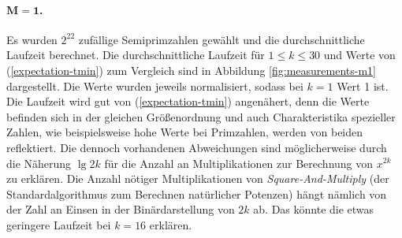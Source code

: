 \documentclass[a4paper, 10pt, ngerman]{article}
\begin{document}
    \paragraph{$\bm{M = 1}$.} Es wurden $2^{22}$ zufällige Semiprimzahlen gewählt und die durchschnittliche Laufzeit berechnet. Die durchschnittliche Laufzeit für $1 \le k \le 30$ und Werte von (\ref{expectation-tmin}) zum Vergleich sind in Abbildung \ref{fig:measurements-m1} dargestellt. Die Werte wurden jeweils normalisiert, sodass bei $k = 1$ Wert 1 ist. Die Laufzeit wird gut von (\ref{expectation-tmin}) angenähert, denn die Werte befinden sich in der gleichen Größenordnung und auch Charakteristika spezieller Zahlen, wie beispielsweise hohe Werte bei Primzahlen, werden von beiden reflektiert. Die dennoch vorhandenen Abweichungen sind möglicherweise durch die Näherung $\lg 2k$ für die Anzahl an Multiplikationen zur Berechnung von $x^{2k}$ zu erklären. Die Anzahl nötiger Multiplikationen von \emph{Square-And-Multiply} (der Standardalgorithmus zum Berechnen natürlicher Potenzen) hängt nämlich von der Zahl an Einsen in der Binärdarstellung von $2k$ ab. Das könnte die etwas geringere Laufzeit bei $k = 16$ erklären.
\end{document}
